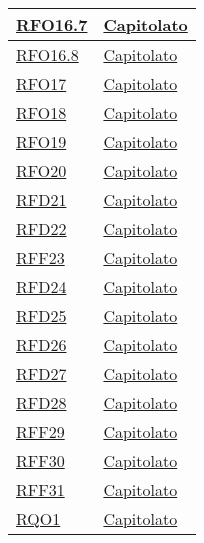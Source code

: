 \begin{longtable}{|>{\centering}m{5cm}|m{5cm}<{\centering}|}
\hyperlink{RFO16.7}{RFO16.7} & \hyperlink{Capitolato}{Capitolato}\\ \hline

\hyperlink{RFO16.8}{RFO16.8} & \hyperlink{Capitolato}{Capitolato}\\ \hline

\hyperlink{RFO17}{RFO17} & \hyperlink{Capitolato}{Capitolato}\\ \hline

\hyperlink{RFO18}{RFO18} & \hyperlink{Capitolato}{Capitolato}\\ \hline

\hyperlink{RFO19}{RFO19} & \hyperlink{Capitolato}{Capitolato}\\ \hline

\hyperlink{RFO20}{RFO20} & \hyperlink{Capitolato}{Capitolato}\\ \hline

\hyperlink{RFD21}{RFD21} & \hyperlink{Capitolato}{Capitolato}\\ \hline

\hyperlink{RFD22}{RFD22} & \hyperlink{Capitolato}{Capitolato}\\ \hline

\hyperlink{RFF23}{RFF23} & \hyperlink{Capitolato}{Capitolato}\\ \hline

\hyperlink{RFD24}{RFD24} & \hyperlink{Capitolato}{Capitolato}\\ \hline

\hyperlink{RFD25}{RFD25} & \hyperlink{Capitolato}{Capitolato}\\ \hline

\hyperlink{RFD26}{RFD26} & \hyperlink{Capitolato}{Capitolato}\\ \hline

\hyperlink{RFD27}{RFD27} & \hyperlink{Capitolato}{Capitolato}\\ \hline

\hyperlink{RFD28}{RFD28} & \hyperlink{Capitolato}{Capitolato}\\ \hline

\hyperlink{RFF29}{RFF29} & \hyperlink{Capitolato}{Capitolato}\\ \hline

\hyperlink{RFF30}{RFF30} & \hyperlink{Capitolato}{Capitolato}\\ \hline

\hyperlink{RFF31}{RFF31} & \hyperlink{Capitolato}{Capitolato}\\ \hline

\hyperlink{RQO1}{RQO1} & \hyperlink{Capitolato}{Capitolato}\\ \hline


\end{longtable}
